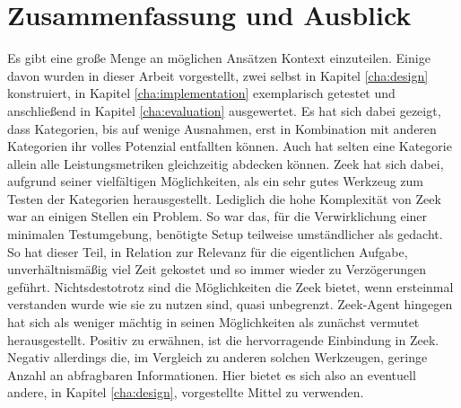 \chapter{Zusammenfassung und Ausblick}%
\label{cha:conclusion}


Es gibt eine große Menge an möglichen Ansätzen Kontext einzuteilen. Einige davon wurden in dieser Arbeit vorgestellt, zwei selbst in Kapitel \ref{cha:design} konstruiert, in Kapitel \ref{cha:implementation} exemplarisch getestet und anschließend in Kapitel \ref{cha:evaluation} ausgewertet. Es hat sich dabei gezeigt, dass Kategorien, bis auf wenige Ausnahmen, erst in Kombination mit anderen Kategorien ihr volles Potenzial entfallten können. Auch hat selten eine Kategorie allein alle Leistungsmetriken gleichzeitig abdecken können. Zeek hat sich dabei, aufgrund seiner vielfältigen Möglichkeiten, als ein sehr gutes Werkzeug zum Testen der Kategorien herausgestellt. Lediglich die hohe Komplexität von Zeek war an einigen Stellen ein Problem. So war das, für die Verwirklichung einer minimalen Testumgebung, benötigte Setup teilweise umständlicher als gedacht. So hat dieser Teil, in Relation zur Relevanz für die eigentlichen Aufgabe, unverhältnismäßig viel Zeit gekostet und so immer wieder zu Verzögerungen geführt. Nichtsdestotrotz sind die Möglichkeiten die Zeek bietet, wenn ersteinmal verstanden wurde wie sie zu nutzen sind, quasi unbegrenzt. Zeek-Agent hingegen hat sich als weniger mächtig in seinen Möglichkeiten als zunächst vermutet herausgestellt. Positiv zu erwähnen, ist die hervorragende Einbindung in Zeek. Negativ allerdings die, im Vergleich zu anderen solchen Werkzeugen, geringe Anzahl an abfragbaren Informationen. Hier bietet es sich also an eventuell andere, in Kapitel \ref{cha:design}, vorgestellte Mittel zu verwenden. 
